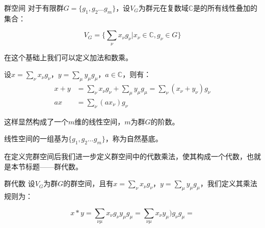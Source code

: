 \begin{issues}
\issueDraft
\end{issues}

\begin{definition}{群空间}
对于有限群$G=\{g_1,g_2...g_m\}$，设$V_G$为群元在复数域$\mathbb{C}$是的所有线性叠加的集合：

\begin{equation}
V_G=\{\displaystyle\sum_\nu x_\nu g_\nu|x_\nu \in \mathbb{C},g_\nu \in G\}
\end{equation}

在这个基础上我们可以定义加法和数乘。

设$x=\displaystyle\sum_\nu x_\nu g_\nu$，$y=\displaystyle\sum_\mu y_\mu g_\mu$，$a\in \mathbb{C}$，则有：
\begin{align}
x+y&=\displaystyle\sum_\nu x_\nu g_\nu+\displaystyle\sum_\mu y_\mu g_\mu=\displaystyle\sum_\nu(x_\nu+y_\nu)g_\nu\\
ax&=\displaystyle\sum_\nu (ax_\nu) g_\nu
\end{align}

这样显然构成了一个$m$维的线性空间，$m$为群$G$的阶数。

线性空间的一组基为$\{g_1,g_2...g_m\}$，称为自然基底。

\end{definition}

在定义完群空间后我们进一步定义群空间中的代数乘法，使其构成一个代数，也就是本节标题——群代数。

\begin{definition}{群代数}
设$V_G$为群$G$的群空间，且有$x=\displaystyle\sum_\nu x_\nu g_\nu$，$y=\displaystyle\sum_\mu y_\mu g_\mu$，我们定义其乘法规则为：

\begin{equation}
x*y=\displaystyle\sum_{\nu\mu}x_\nu g_\nu y_\mu g_\mu=
\displaystyle\sum_{\nu\mu}x_\nu y_\mu) g_\nu g_\mu=
\end{equation}
\end{definition}